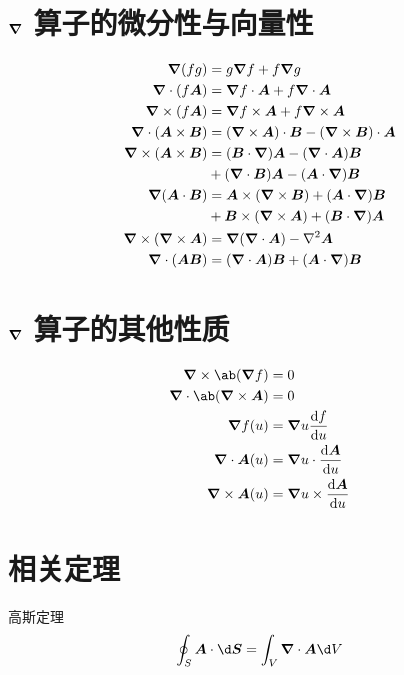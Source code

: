 \section{\texorpdfstring{$\bm{\nabla}$}{nabla} 算子的微分性与向量性}

\begin{align}
\bm{\nabla}{(f g)} &= g \bm{\nabla}{f} + f \bm{\nabla}{g} \\
\bm{\nabla} \cdot{(f \bm{A})} &= \bm{\nabla}{f} \cdot \bm{A} + f \bm{\nabla} \cdot{\bm{A}} \\
\bm{\nabla} \times{(f \bm{A})} &= \bm{\nabla}{f} \times \bm{A} + f \bm{\nabla} \times{\bm{A}} \\
\bm{\nabla} \cdot{(\bm{A} \times \bm{B})} &= (\bm{\nabla} \times{\bm{A}}) \cdot \bm{B} - (\bm{\nabla} \times{\bm{B}}) \cdot \bm{A} \\
\bm{\nabla} \times{(\bm{A} \times \bm{B})} &= (\bm{B} \cdot \bm{\nabla}) \bm{A} - (\bm{\nabla} \cdot{\bm{A}}) \bm{B} \\
& + (\bm{\nabla} \cdot{\bm{B}}) \bm{A} - (\bm{A} \cdot \bm{\nabla}) \bm{B} \\
\bm{\nabla}{(\bm{A} \cdot \bm{B})} &= \bm{A} \times (\bm{\nabla} \times{\bm{B}}) + (\bm{A} \cdot \bm{\nabla}) \bm{B} \\
& + \bm{B} \times (\bm{\nabla} \times{\bm{A}}) + (\bm{B} \cdot \bm{\nabla}) \bm{A} \\
\bm{\nabla} \times{(\bm{\nabla} \times {\bm{A}})} &= \bm{\nabla}{(\bm{\nabla} \cdot{\bm{A}})} - \nabla^2 \bm{A} \\
\bm{\nabla} \cdot{(\bm{A} \bm{B})} &= (\bm{\nabla} \cdot{\bm{A}}) \bm{B} + (\bm{A} \cdot \bm{\nabla}) \bm{B}
\end{align}

\section{\texorpdfstring{$\bm{\nabla}$}{nabla} 算子的其他性质}

\begin{align}
    \curl\ab(\grad{f}) &= 0 \\
    \dive\ab(\curl\vec{A}) &= 0 \\
    \grad f(u) &= \grad{u} \odv{f}{u} \\
    \dive\vec{A}(u) &= \grad{u} \cdot \odv{\vec{A}}{u} \\
    \curl\vec{A}(u) &= \grad{u} \times \odv{\vec{A}}{u}
\end{align}

\section{相关定理}

高斯定理
\begin{equation}
    \oint_S \vec{A} \cdot \d \vec{S}
    = \int_V \dive{\vec{A}} \d V
\end{equation}

